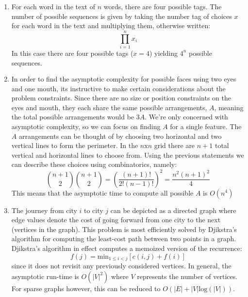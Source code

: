 \documentclass[12pt]{article}
\begin{document}
\begin{enumerate}[label=(\alph*)]
  \item For each word in the text of \(n\) words, there are four possible tags.
		The number of possible sequences is given by taking the number tag of choices
		\(x\) for each word in the text and multiplying them, otherwise written:
		\[
			\prod_{i=1}^nx_i
		\]
		In this case there are four possible tags (\(x=4\)) yielding \(4^n\) possible
		sequences.

	\item In order to find the asymptotic complexity for possible faces using
		two eyes and one mouth, its instructive to make certain considerations
		about the problem constraints. Since there are no size or position constraints
		on the eyes and mouth, they each share the same possible arrangements, \(A\),
		meaning the total possible arrangements would be \(3A\). We're only concerned
		with asymptotic complexity, so we can focus on finding \(A\) for a single feature.
		The \(A\) arrangements can be thought of by choosing two horizontal and two
		vertical lines to form the perimeter. In the \(n\text{x}n\) grid there are
		\(n+1\) total vertical and horizontal lines to choose from. Using the previous
		statements we can describe these choices using combinatorics, namely:
		\[
			\binom{n+1}{2}\binom{n+1}{2} =
			\left( \frac{(n+1)!}{2!(n-1)!} \right)^2 =
			\frac{n^2(n+1)^2}{4}
		\]
		This means that the asymptotic time to compute all possible \(A\) is \(O(n^4)\)

  \item The journey from city \(i\) to city \(j\) can be depicted as a
		directed graph where edge values denote the cost of going forward from
		one city to the next (vertices in the graph). This problem is most
		efficiently solved by Djikstra's algorithm for computing the least-cost
		path between two points in a graph. Djikstra's algorithm in effect computes
		a memoized version of the recurrence:
		\[
			f(j) = \text{min}_{1\leq i < j}[c(i,j) + f(i)]
		\]
		since it does not revisit any previously considered vertices.
		In general, the asymptotic run-time is
		\(O(\lvert V \rvert^2)\) where \(V\) represents the number of vertices. For
		sparse graphs however, this can be reduced to
		\(O(\lvert E \rvert + \lvert V \rvert \text{log}( \lvert V \rvert ))\).


\end{enumerate}
\end{document}
